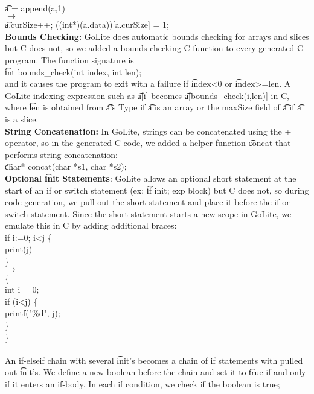 \documentclass[11pt]{article}
\begin{document}
\\[6pt]
\t{a = append(a,1)}\\
$\longrightarrow$\\
\t{a.curSize++; ((int*)(a.data))[a.curSize] = 1;}
\\[12pt]
{\bf Bounds Checking: }GoLite does automatic bounds checking for arrays and slices but C does not, so we added a bounds checking C function to every generated C program. The function signature is
\\[6pt]
\t{int bounds\_check(int index, int len);}
\\[6pt]
and it causes the program to exit with a failure if \t{index<0} or \t{index>=len}. A GoLite indexing expression such as \t{a[i]} becomes \t{a[bounds\_check(i,len)]} in C, where \t{len} is obtained from \t{a}'s Type if \t{a} is an array or the maxSize field of \t{a} if \t{a} is a slice.
\\[12pt]
{\bf String Concatenation: } In GoLite, strings can be concatenated using the + operator, so in the generated C code, we added a helper function \t{concat} that performs string concatenation: 
\\[6pt]
\t{char* concat(char *s1, char *s2);}
\\[12pt]
{\bf Optional \t{init} Statements}: GoLite allows an optional short statement at the start of an if or switch statement (ex: \t{if init; exp block}) but C does not, so during code generation, we pull out the short statement and place it before the if or switch statement. Since the short statement starts a new scope in GoLite, we emulate this in C by adding additional braces:  
\\[6pt]
\t{
if i:=0; i<j \{ \\
\indent print(j) \\
\} \\
}
$\longrightarrow$ \\
\t{ \{ \\
\indent int i = 0; \\
\indent if (i<j) \{\\
\indent \indent printf("\%d", j); \\
\indent \}\\
\} \\
}
\\[6pt]
An if-elseif chain with several \t{init}'s becomes a chain of if statements with pulled out \t{init}'s. We define a new boolean before the chain and set it to \t{true} if and only if it enters an if-body. In each if condition, we check if the boolean is true;
\\[6pt]
\end{document}
